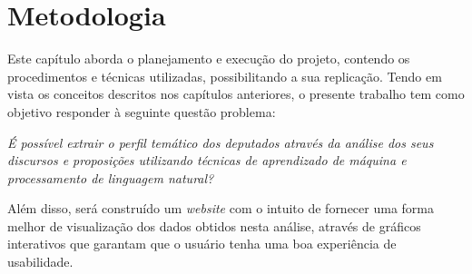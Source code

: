 \chapter{Metodologia}

Este capítulo aborda o planejamento e execução do projeto, contendo os procedimentos e técnicas utilizadas, possibilitando a sua  replicação. Tendo em vista os conceitos descritos nos capítulos anteriores, o presente trabalho tem como objetivo responder à seguinte questão problema:

\begin{center}
\textit{É possível extrair o perfil temático dos deputados através da análise dos seus discursos e proposições utilizando técnicas de aprendizado de máquina e processamento de linguagem natural?}
\end{center}

Além disso, será construído um \textit{website} com o intuito de fornecer uma forma melhor de visualização dos dados obtidos nesta análise, através de gráficos interativos que garantam que o usuário tenha uma boa experiência de usabilidade.




